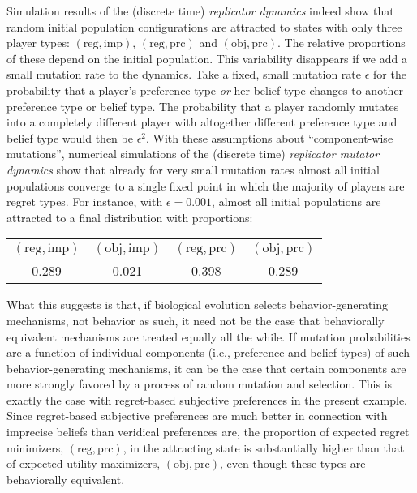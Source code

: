 \documentclass[fleqn,reqno,11pt]{article}
\begin{document}
Simulation results of the (discrete time) \emph{replicator dynamics}
\citep{TaylorJonker1978:Evolutionary-St} indeed show that random initial population
configurations are attracted to states with only three player types:
$(\text{reg}, \text{imp})$, $(\text{reg}, \text{prc})$ and $(\text{obj}, \text{prc})$. The
relative proportions of these depend on the initial population. This variability disappears if
we add a small mutation rate to the dynamics. Take a fixed, small mutation rate $\epsilon$ for
the probability that a player's preference type \emph{or} her belief type changes to another
preference type or belief type. The probability that a player randomly mutates into a
completely different player with altogether different preference type and belief type would
then be $\epsilon^2$. With these assumptions about ``component-wise mutations'', numerical
simulations of the (discrete time) \emph{replicator mutator dynamics}
\citep{Nowak2006:Evolutionary-Dy} show that already for very small mutation rates almost all
initial populations converge to a single fixed point in which the majority of players are
regret types. For instance, with $\epsilon = 0.001$, almost all initial populations are
attracted to a final distribution with proportions:

\begin{center}
  \begin{tabular}{cccc}
    $(\text{reg}, \text{imp})$ & $(\text{obj}, \text{imp})$ & $(\text{reg},
      \text{prc})$ & $(\text{obj}, \text{prc})$ \\ \hline
    0.289  & 0.021 &   0.398 &    0.289 
  \end{tabular}
\end{center}

What this suggests is that, if biological evolution selects behavior-generating mechanisms, not
behavior as such, it need not be the case that behaviorally equivalent mechanisms are treated
equally all the while. If mutation probabilities are a function of individual components (i.e.,
preference and belief types) of such behavior-generating mechanisms, it can be the case that
certain components are more strongly favored by a process of random mutation and
selection. This is exactly the case with regret-based subjective preferences in the present
example. Since regret-based subjective preferences are much better in connection with imprecise
beliefs than veridical preferences are, the proportion of expected regret minimizers,
$(\text{reg}, \text{prc})$, in the attracting state is substantially higher than that of
expected utility maximizers, $(\text{obj}, \text{prc})$, even though these types are
behaviorally equivalent.
\end{document}
